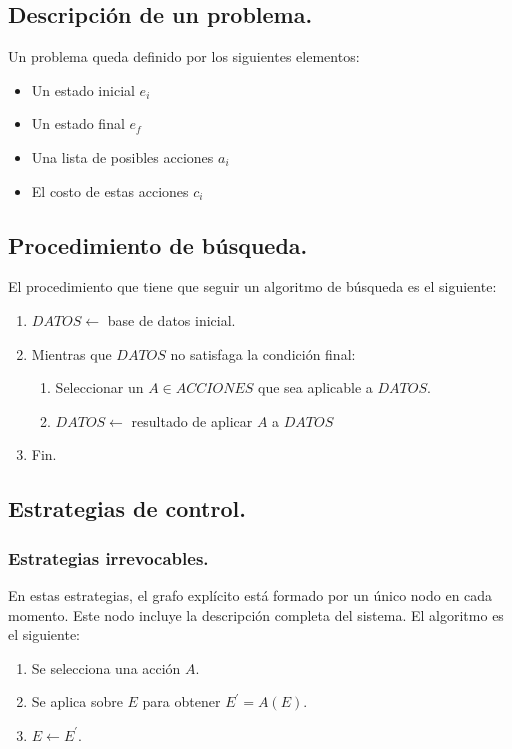 \documentclass[12pt,spanish]{article}
\numberwithin{definition}{subsection}
\begin{document}
\subsection{Descripción de un problema.}

Un problema queda definido por los siguientes elementos:
\begin{itemize}
	\item Un estado inicial $e_i$
	\item Un estado final $e_f$
	\item Una lista de posibles acciones $a_i$
	\item El costo de estas acciones $c_i$
\end{itemize}

\subsection{Procedimiento de búsqueda.}

El procedimiento que tiene que seguir un algoritmo de búsqueda es el siguiente:
\begin{enumerate}
	\item $DATOS \leftarrow$ base de datos inicial.
	\item Mientras que $DATOS$ no satisfaga la condición final:
		\begin{enumerate}
			\item Seleccionar un $A \in ACCIONES$ que sea aplicable a $DATOS$.
			\item $DATOS \leftarrow$ resultado de aplicar $A$ a $DATOS$
		\end{enumerate}
		\item Fin.
\end{enumerate}

\subsection{Estrategias de control.}

\subsubsection{Estrategias irrevocables.}

En estas estrategias, el grafo explícito está formado por un único nodo en cada momento. Este nodo incluye la descripción completa del sistema. El algoritmo es el siguiente:

\begin{enumerate}
	\item Se selecciona una acción $A$.
	\item Se aplica sobre $E$ para obtener $E^{\prime}=A(E)$.
	\item $E \leftarrow E^{\prime}$.
\end{enumerate}
\end{document}
